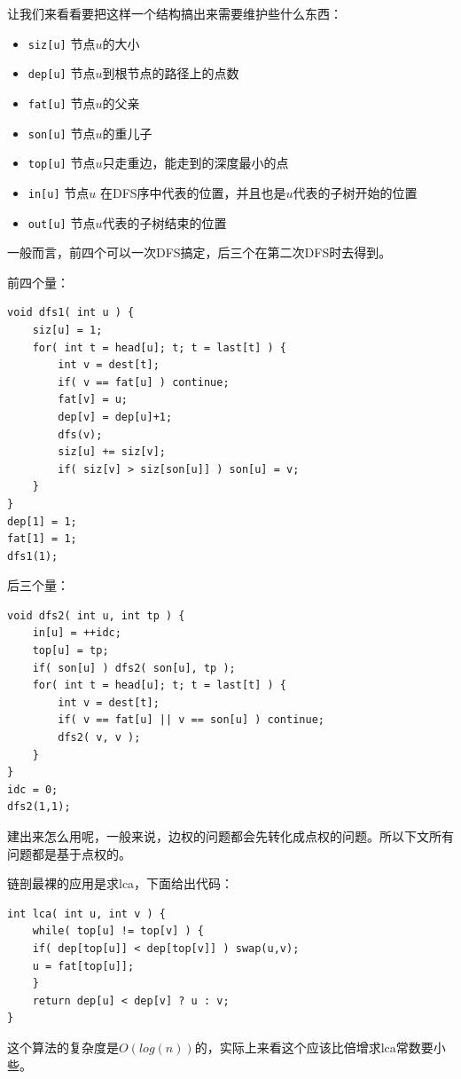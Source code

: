\documentclass{beamer}
\begin{document}
		\begin{frame}
			让我们来看看要把这样一个结构搞出来需要维护些什么东西：
			
			\begin{itemize}
				\item \texttt{siz[u]} 节点$u$的大小
				\item \texttt{dep[u]} 节点$u$到根节点的路径上的点数
				\item \texttt{fat[u]} 节点$u$的父亲
				\item \texttt{son[u]} 节点$u$的重儿子
				\item \texttt{top[u]} 节点$u$只走重边，能走到的深度最小的点
				\item \texttt{in[u]} 节点$u$ 在DFS序中代表的位置，并且也是$u$代表的子树开始的位置
				\item \texttt{out[u]} 节点$u$代表的子树结束的位置
			\end{itemize}
			
			一般而言，前四个可以一次DFS搞定，后三个在第二次DFS时去得到。
		\end{frame}
		\begin{frame}[fragile=singleslide]
			前四个量：
			\begin{verbatim}
void dfs1( int u ) {
    siz[u] = 1;
    for( int t = head[u]; t; t = last[t] ) {
        int v = dest[t];
        if( v == fat[u] ) continue;
        fat[v] = u;
        dep[v] = dep[u]+1;
        dfs(v);
        siz[u] += siz[v];
        if( siz[v] > siz[son[u]] ) son[u] = v;
    }
}
dep[1] = 1;
fat[1] = 1;
dfs1(1);
			\end{verbatim}
		\end{frame}
		\begin{frame}[fragile=singleslide]
			后三个量：
			\begin{verbatim}
void dfs2( int u, int tp ) {
    in[u] = ++idc;
    top[u] = tp;
    if( son[u] ) dfs2( son[u], tp );
    for( int t = head[u]; t; t = last[t] ) {
        int v = dest[t];
        if( v == fat[u] || v == son[u] ) continue;
        dfs2( v, v );
    }
}	
idc = 0;
dfs2(1,1);
			\end{verbatim}
		\end{frame}
		\begin{frame}[fragile=singleslide]
			建出来怎么用呢，一般来说，边权的问题都会先转化成点权的问题。所以下文所有问题都是基于点权的。
			
			链剖最裸的应用是求lca，下面给出代码：
			
			\begin{verbatim}
int lca( int u, int v ) {
    while( top[u] != top[v] ) {
    if( dep[top[u]] < dep[top[v]] ) swap(u,v);
    u = fat[top[u]];
    }
    return dep[u] < dep[v] ? u : v;
}
			\end{verbatim}
			
			这个算法的复杂度是$O(log(n))$的，实际上来看这个应该比倍增求lca常数要小些。
		\end{frame}
\end{document}
